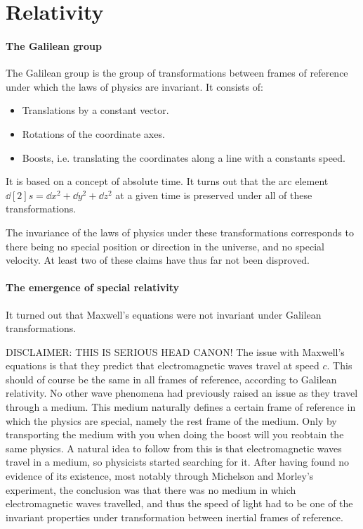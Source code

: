 \section{Relativity}

\paragraph{The Galilean group}
The Galilean group is the group of transformations between frames of reference under which the laws of physics are invariant. It consists of:
\begin{itemize}
	\item Translations by a constant vector.
	\item Rotations of the coordinate axes.
	\item Boosts, i.e. translating the coordinates along a line with a constants speed.
\end{itemize}
It is based on a concept of absolute time. It turns out that the arc element $\dd[2]{s} = \dd{x}^{2} + \dd{y}^{2} + \dd{z}^{2}$ at a given time is preserved under all of these transformations.

The invariance of the laws of physics under these transformations corresponds to there being no special position or direction in the universe, and no special velocity. At least two of these claims have thus far not been disproved.

\paragraph{The emergence of special relativity}
It turned out that Maxwell's equations were not invariant under Galilean transformations. 

DISCLAIMER: THIS IS SERIOUS HEAD CANON! The issue with Maxwell's equations is that they predict that electromagnetic waves travel at speed $c$. This should of course be the same in all frames of reference, according to Galilean relativity. No other wave phenomena had previously raised an issue as they travel through a medium. This medium naturally defines a certain frame of reference in which the physics are special, namely the rest frame of the medium. Only by transporting the medium with you when doing the boost will you reobtain the same physics. A natural idea to follow from this is that electromagnetic waves travel in a medium, so physicists started searching for it. After having found no evidence of its existence, most notably through Michelson and Morley's experiment, the conclusion was that there was no medium in which electromagnetic waves travelled, and thus the speed of light had to be one of the invariant properties under transformation between inertial frames of reference.

